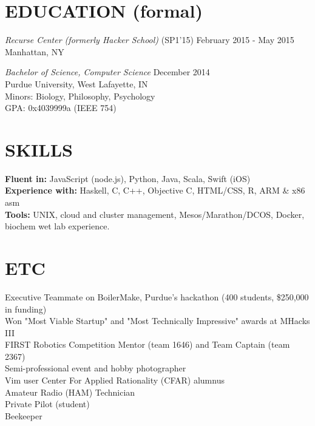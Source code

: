 \documentclass[margin,4pt]{res} %
\begin{document}
\begin{resume}
\section{EDUCATION (formal)}
	{\sl Recurse Center (formerly Hacker School)} \hfill (SP1'15) February 2015 - May 2015\\
		Manhattan, NY

	{\sl Bachelor of Science, Computer Science }\hfill  December 2014\\
		Purdue University, West Lafayette, IN\\
		Minors: Biology, Philosophy, Psychology \\
		GPA: 0x4039999a (IEEE 754)


\section{SKILLS} 
	{\bf Fluent in:} JavaScript (node.js), Python, Java, Scala, Swift (iOS)\\
 	{\bf Experience with:} Haskell, C, C++, Objective C, HTML/CSS, R, ARM \& x86 asm\\
	{\bf Tools:} UNIX, cloud and cluster management, Mesos/Marathon/DCOS, Docker, biochem wet lab experience.


\section{ETC}  
	Executive Teammate on BoilerMake, Purdue's hackathon (400 students, \$250,000 in funding)\\
	Won "Most Viable Startup" and "Most Technically Impressive" awards at MHacks III\\
	FIRST Robotics Competition Mentor (team 1646) and Team Captain (team 2367)\\
	Semi-professional event and hobby photographer\\
	Vim user
	Center For Applied Rationality (CFAR) alumnus\\
	Amateur Radio (HAM) Technician\\
	Private Pilot (student)\\
	Beekeeper\\


\end{resume}
\end{document}
